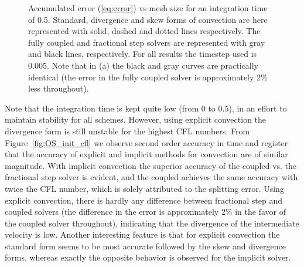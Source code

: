 \begin{figure}
 \centering
 \caption{Accumulated error (\ref{eq:error}) vs mesh size for an integration time of 0.5. Standard, divergence and skew forms of convection are here represented with solid, dashed and dotted lines respectively. The fully coupled and fractional step solvers are represented with gray and black lines, respectively. For all results the timestep used is 0.005. Note that in (a) the black and gray curves are practically identical (the error in the fully coupled solver is approximately 2\% less throughout). }
\label{fig:OS_init_dx}
\end{figure}
Note that the integration time is kept quite low (from 0 to 0.5), in an effort to maintain stability for all schemes. However, using explicit convection the divergence form is still unstable for the highest CFL numbers. From Figure~\ref{fig:OS_init_cfl} we observe second order accuracy in time and register that the accuracy of explicit and implicit methods for convection are of similar magnitude. With implicit convection the superior accuracy of the coupled vs. the fractional step solver is evident, and the coupled achieves the same accuracy with twice the CFL number, which is solely attributed to the splitting error. Using explicit convection, there is hardly any difference between fractional step and coupled solvers (the difference in the error is approximately 2\% in the favor of the coupled solver throughout), indicating that the divergence of the intermediate velocity is low. Another interesting feature is that for explicit convection the standard form seems to be most accurate followed by the skew and divergence forms, whereas exactly the opposite behavior is observed for the implicit solver.

